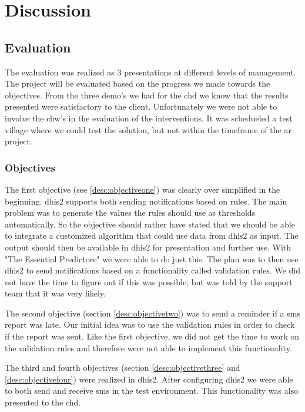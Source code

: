 \chapter{Discussion}

\section{Evaluation}
The evaluation was realized as 3 presentations at different levels of management. 
The project will be evaluated based on the progress we made towards the objectives.
From the three demo's we had for the \gls{chd} we know that the results presented were satisfactory to the client.
Unfortunately we were not able to involve the \gls{chw}'s in the evaluation of the interventions.
It was schedueled a test village where we could test the solution, but not within the timeframe of the \gls{ar} project.


\subsection{Objectives}
The first objective (see \ref{desc:objectiveone}) was clearly over simplified in the beginning.
\gls{dhis2} supports both sending notifications based on rules. The main problem was to generate the values the rules should use as thresholds automatically. So the objective should rather have stated that we should be able to integrate a customized algorithm that could use data from \gls{dhis2} as input. The output should then be available in \gls{dhis2} for presentation and further use. 
With "The Essential Predictore" we were able to do just this. The plan was to then use \gls{dhis2} to send notifications based on a functionality called validation rules.
We did not have the time to figure out if this was possible, but was told by the support team that it was very likely. 

The second objective (section \ref{desc:objectivetwo}) was to send a reminder if a \gls{sms} report was late. Our initial idea was to use the validation rules in order to check if the report was sent. Like the first objective, we did not get the time to work on the validation rules and therefore were not able to implement this functionality.

The third and fourth objectives (section \ref{desc:objectivethree} and \ref{desc:objectivefour}) were realized in \gls{dhis2}. After configuring \gls{dhis2} we were able to both send and receive \gls{sms} in the test environment. This functionality was also presented to the \gls{chd}.


